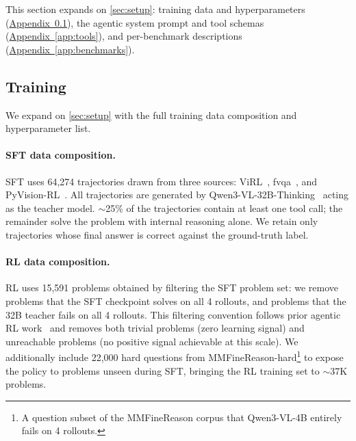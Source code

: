 \documentclass{llmxive}
\providecommand{\appref}[1]{\hyperref[#1]{Appendix~\ref*{#1}}}
\begin{document}
This section expands on \autoref{sec:setup}: training data and hyperparameters (\appref{app:training-setup}), the agentic system prompt and tool schemas (\appref{app:tools}), and per-benchmark descriptions (\appref{app:benchmarks}).

\subsection{Training}
\label{app:training-setup}

We expand on \autoref{sec:setup} with the full training data composition and hyperparameter list.

\paragraph{SFT data composition.}
SFT uses 64{,}274 trajectories drawn from three sources: ViRL~\citep{virl}, fvqa~\citep{fvqa}, and PyVision-RL~\citep{pyvision-rl}. All trajectories are generated by Qwen3-VL-32B-Thinking~\citep{Qwen3VL} acting as the teacher model. $\sim$25\% of the trajectories contain at least one tool call; the remainder solve the problem with internal reasoning alone. We retain only trajectories whose final answer is correct against the ground-truth label.

\paragraph{RL data composition.}
RL uses 15{,}591 problems obtained by filtering the SFT problem set: we remove problems that the SFT checkpoint solves on all 4 rollouts, and problems that the 32B teacher fails on all 4 rollouts. This filtering convention follows prior agentic RL work~\citep{deepeyesv2, prorl} and removes both trivial problems (zero learning signal) and unreachable problems (no positive signal achievable at this scale). We additionally include 22{,}000 hard questions from MMFineReason-hard\footnote{A question subset of the MMFineReason corpus that Qwen3-VL-4B entirely fails on 4 rollouts.} to expose the policy to problems unseen during SFT, bringing the RL training set to $\sim$37K problems.
\end{document}
